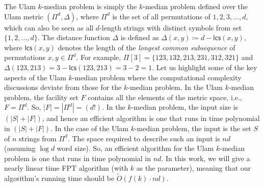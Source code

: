 \documentclass[11pt]{llncs}
\newcommand{\lcs}{{\textsf{lcs}}}
\begin{document}
The Ulam $ k$-median problem is simply the $ k$-median problem defined over the Ulam metric $(\Pi^d, \Delta)$, where $\Pi^d$ is the set of all permutations of $1, 2, 3, ..., d$, which can also be seen as all $d$-length strings with distinct symbols from set $\{1, 2, ..., d\}$.
The distance function $\Delta$ is defined as $\Delta(x, y) \coloneq d - \lcs(x, y)$, where $\lcs(x, y)$ denotes the length of the {\em longest common subsequence} of permutations $x, y \in \Pi^d$. For example, $\Pi[3] = \{123, 132, 213, 231, 312, 321\}$ and $\Delta(123, 213) = 3 - \lcs(123, 213) = 3 - 2 = 1$. 
Let us highlight some of the key aspects of the Ulam $k$-median problem where the computational complexity discussions deviate from those for the $k$-median problem. In the Ulam $k$-median problem, the facility set $F$ contains all the elements of the metric space, i.e., $F = \Pi^d$. So, $|F| = |\Pi^d| = (d!)$. 
In the $k$-median problem, the input size is $(|S| + |F|)$, and hence an efficient algorithm is one that runs in time polynomial in $(|S|+|F|)$. In the case of the Ulam $k$-median problem, the input is the set $S$ of $n$ strings from $\Pi^d$. The space required to describe such an input is $n d$ (assuming $\log{d}$ word size). 
So, an efficient algorithm for the Ulam $k$-median problem is one that runs in time polynomial in $n d$.
In this work, we will give a nearly linear time FPT algorithm (with $k$ as the parameter), meaning that our algorithm's running time should be $ \tilde{O}(f(k) \cdot nd)$.
\end{document}
